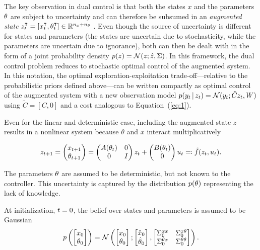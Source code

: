 The key observation in dual control is that both the states $x$ and the
parameters $\theta$ are subject to uncertainty and can therefore be subsumed in an
\emph{augmented state} $z_t^{\intercal} = [ x_t^{\intercal}, \theta_t^{\intercal}] \in\mathbb{R}^{n_x+n_\theta}$
. Even though the source of uncertainty is different
for states and parameters (the states are uncertain due to stochasticity, while
the parameters are uncertain due to ignorance), both can then be dealt with in
the form of a joint probability density $p(z)=\mathcal{N}(z;\hat z,\Sigma)$. In this
framework, the dual control problem reduces to stochastic optimal control of the
augmented system. In this notation, the optimal exploration-exploitation
trade-off---relative to the probabilistic priors defined above---can be written
compactly as optimal control of the augmented system with a new observation
model $p(y_t\,|\, z_t)=\mathcal{N}(y_t;\tilde{C}z_t,W)$ using $\tilde{C}=[C,0]$
and a cost analogous to Equation~(\ref{eq:1}).

Even for the linear and deterministic case, including the augmented state $z$
results in a nonlinear system because $\theta$ and $x$ interact
multiplicatively
\begin{fullwidth}\vspace{-\baselineskip}
\begin{equation}
  \label{eq:augmented-system}
  z_{\tk+1} =
  \begin{pmatrix}
    x_{\tk+1}\\\theta_{\tk+1}
  \end{pmatrix} =
  \begin{pmatrix}
    A(\theta_\tk) & 0 \\ 0 & I
  \end{pmatrix}z_\tk +
  \begin{pmatrix}
    B(\theta_\tk) \\ 0
  \end{pmatrix}u_\tk
  \eqqcolon
  \tilde f(z_\tk, u_\tk).
\end{equation}
\end{fullwidth}
The parameters $\theta$ are assumed to be deterministic, but not known to the
controller. This uncertainty is captured by the distribution $p(\theta)$
representing the lack of knowledge.

At initialization, $t=0$, the belief over
states and parameters is assumed to be Gaussian
\begin{equation}
\label{eq:13}
  p\left(\begin{bmatrix}x_0\\ \t_0 \end{bmatrix}\right)
  = \N\left(
  \begin{bmatrix}
    x_0\\ \t_0
  \end{bmatrix}
  ;
  \begin{bmatrix}
    \hat x_0\\ \hat{\t}_0
  \end{bmatrix}
  ,
  \begin{bmatrix}
    \Sigma^{xx} _0 & \Sigma^{x\t} _0 \\ \Sigma^{\t x} _0 & \Sigma^{\t\t} _0
  \end{bmatrix} \right).
\end{equation}

